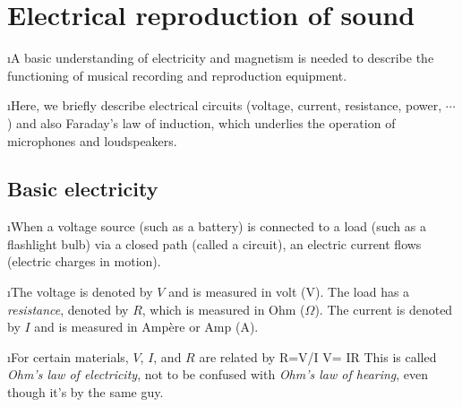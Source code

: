 \section{Electrical reproduction of sound}

\bi
\i A basic understanding of electricity and magnetism is 
needed to describe the functioning of musical recording 
and reproduction equipment.

\i Here, we briefly describe electrical circuits (voltage, current,
resistance, power, $\cdots$) and also Faraday's law of induction, 
which underlies the operation of microphones and loudspeakers.

\ei

\subsection{Basic electricity}

\bi

\i When a voltage source (such as a battery) is connected to a 
load (such as a flashlight bulb) via a closed path (called a
circuit), an electric current flows (electric charges in motion).

\i The voltage is denoted by $V$ and is measured in volt (V).
The load has a {\em resistance}, denoted by $R$, which is 
measured in Ohm ($\Omega$).
The current is denoted by $I$ and is measured in Amp\`ere or 
Amp (A).

\i For certain materials, $V$, $I$, and $R$ are related by 
%
\be
R=V/I\quad 
V= IR
\ee
%
This is called {\em Ohm's law of electricity}, not to be confused
with {\em Ohm's law of hearing}, even though it's by the same guy.

